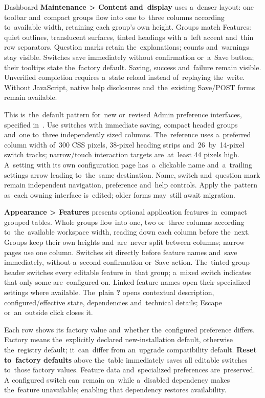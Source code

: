 \documentclass[11pt,a4paper]{article}
\newcommand{\ui}[1]{\textbf{#1}}
\begin{document}
Dashboard \ui{Maintenance > Content and~display} uses a~denser layout:
one toolbar and~compact groups flow into one to~three columns according
to~available width, retaining each group's own height. Groups match Features:
quiet outlines, translucent surfaces, tinted headings with a~left accent
and~thin
row separators. Question marks retain
the~explanations; counts and~warnings stay visible. Switches save immediately
without confirmation or~a~Save button; their tooltips state the~factory default.
Saving, success and~failure remain visible. Unverified completion requires
a~state reload instead of~replaying the~write. Without JavaScript, native help
disclosures and~the~existing Save/POST forms remain available.

This is~the~default pattern for~new or~revised Admin preference interfaces,
specified in~. Use switches with immediate saving,
compact headed groups and~one to~three independently sized columns.
The~reference
uses a~preferred column width of~300 CSS pixels, 38-pixel heading strips
and~26~by~14-pixel switch tracks; narrow/touch interaction targets are~at~least
44 pixels high. A~setting with its own configuration page has~a~clickable name
and~a~trailing settings arrow leading to~the~same destination. Name, switch
and~question mark remain independent navigation, preference and~help controls.
Apply the~pattern as~each owning interface is~edited; older forms may~still
await
migration.

\ui{Appearance > Features} presents optional application features in~compact
grouped tables. Whole groups flow into one, two or~three columns according
to~the~available workspace width, reading down each column before the~next.
Groups keep their own heights and~are~never split between columns; narrow
pages use one column. Switches sit directly before feature names and~save
immediately, without a~second confirmation or~Save action.
The~tinted group header switches
every editable feature in~that group; a~mixed switch indicates that only some
are~configured on. Linked feature names open their specialized settings where
available. The~plain \ui{?} opens contextual description, configured/effective
state, dependencies and~technical details; Escape or~an~outside click closes it.

Each row shows its factory value and~whether the~configured preference differs.
Factory means the~explicitly declared new-installation default, otherwise
the~registry default; it~can~differ from an~upgrade compatibility default.
\ui{Reset to~factory defaults} above the~table immediately saves all editable
switches to~those factory values. Feature data and~specialized preferences
are~preserved. A configured switch can~remain on~while a~disabled dependency
makes the~feature unavailable; enabling that dependency restores availability.
\end{document}
